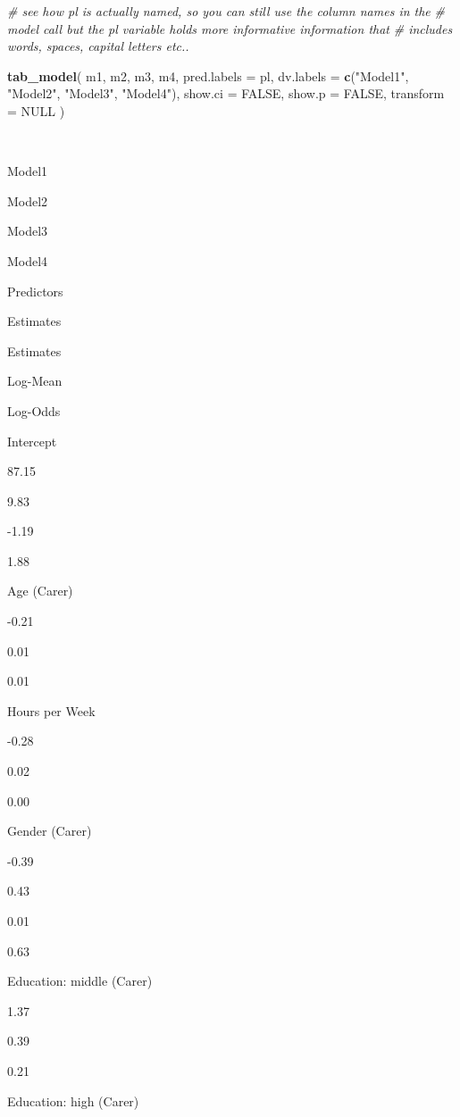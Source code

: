 \documentclass[]{article}
\newenvironment{Shaded}{\begin{snugshade}}{\end{snugshade}}
\newcommand{\KeywordTok}[1]{\textcolor[rgb]{0.13,0.29,0.53}{\textbf{#1}}}
\newcommand{\DataTypeTok}[1]{\textcolor[rgb]{0.13,0.29,0.53}{#1}}
\newcommand{\StringTok}[1]{\textcolor[rgb]{0.31,0.60,0.02}{#1}}
\newcommand{\CommentTok}[1]{\textcolor[rgb]{0.56,0.35,0.01}{\textit{#1}}}
\newcommand{\OtherTok}[1]{\textcolor[rgb]{0.56,0.35,0.01}{#1}}
\newcommand{\NormalTok}[1]{#1}
\begin{document}
\begin{Shaded}
\begin{Highlighting}[]
\CommentTok{# see how pl is actually named, so you can still use the column names in the}
\CommentTok{# model call but the pl variable holds more informative information that}
\CommentTok{# includes words, spaces, capital letters etc..}

\KeywordTok{tab_model}\NormalTok{(}
\NormalTok{  m1, m2, m3, m4,}
  \DataTypeTok{pred.labels =}\NormalTok{ pl,}
  \DataTypeTok{dv.labels =} \KeywordTok{c}\NormalTok{(}\StringTok{"Model1"}\NormalTok{, }\StringTok{"Model2"}\NormalTok{, }\StringTok{"Model3"}\NormalTok{, }\StringTok{"Model4"}\NormalTok{),}
  \DataTypeTok{show.ci =} \OtherTok{FALSE}\NormalTok{,}
  \DataTypeTok{show.p =} \OtherTok{FALSE}\NormalTok{,}
  \DataTypeTok{transform =} \OtherTok{NULL}
\NormalTok{)}
\end{Highlighting}
\end{Shaded}

~

Model1

Model2

Model3

Model4

Predictors

Estimates

Estimates

Log-Mean

Log-Odds

Intercept

87.15

9.83

-1.19

1.88

Age (Carer)

-0.21

0.01

0.01

Hours per Week

-0.28

0.02

0.00

Gender (Carer)

-0.39

0.43

0.01

0.63

Education: middle (Carer)

1.37

0.39

0.21

Education: high (Carer)
\end{document}
